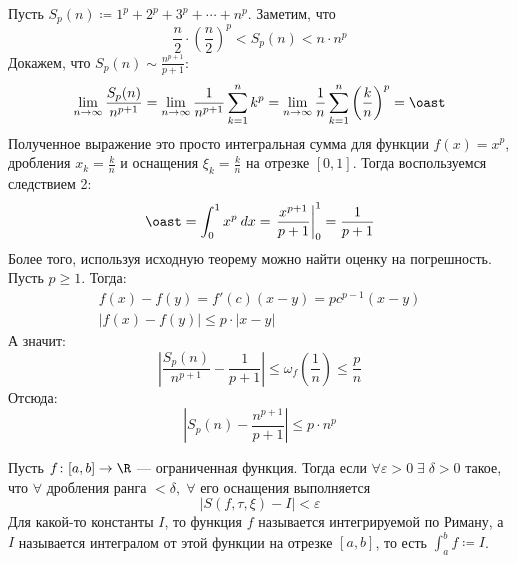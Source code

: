 \begin{example}
  Пусть $S_p(n) \coloneqq 1^p + 2^p + 3^p + \dotsb + n^p$. Заметим, что
  \begin{equation*}
    \frac{n}{2} \cdot \left(\frac{n}{2} \right)^p < S_p(n) < n \cdot n^p
  \end{equation*}
  Докажем, что $S_p(n) \sim \frac{n^{p + 1}}{p + 1}$:
  \begin{equation*}
      \lim\limits_{n \to \infty} \frac{S_p(n)}{n^{p + 1}} =
      \lim\limits_{n \to \infty} \frac{1}{n^{p + 1}}\sum_{k = 1}^{n} k^p =
      \lim\limits_{n \to \infty} \frac{1}{n}\sum_{k = 1}^{n} \left(\frac{k}{n}\right)^p = \oast
  \end{equation*}
  Полученное выражение это просто интегральная сумма для функции $f(x) = x^p$, дробления $x_k = \frac{k}{n}$ и оснащения $\xi_k = \frac{k}{n}$ на отрезке $[0, 1]$. Тогда воспользуемся следствием 2:
  \begin{equation*}
      \oast = \int_{0}^{1} x^p \: dx = \left. \frac{x^{p + 1}}{p + 1} \right|_{0}^{1} = \frac{1}{p + 1}
  \end{equation*}
  Более того, используя исходную теорему можно найти оценку на погрешность. Пусть $p \geq 1$. Тогда:
  \begin{equation*}
    \begin{gathered}
      f(x) - f(y) = f'(c)(x - y) = pc^{p - 1}(x - y) \\
      | f(x) - f(y) | \leq p \cdot |x - y|
    \end{gathered}
  \end{equation*}
  А значит:
  \begin{equation*}
    \left |
      \frac{S_p(n)}{n^{p + 1}} - \frac{1}{p + 1}
    \right |
    \leq \omega_f\left(\frac{1}{n}\right) \leq \frac{p}{n}
  \end{equation*}
  Отсюда:
  \begin{equation*}
    \left |
      S_p(n) -
      \frac{n^{p + 1}}{p + 1}
    \right |
    \leq p \cdot n^p
  \end{equation*}
\end{example}

\begin{conj}
    Пусть $f\colon [a, b] \to \R$ --- ограниченная функция.
    Тогда если $\forall \varepsilon > 0 \; \exists \; \delta > 0$ такое, что $\forall$ дробления ранга $< \delta,\; \forall$ его оснащения выполняется
    \begin{equation*}
        | S(f, \tau, \xi) - I| < \varepsilon
    \end{equation*}
    Для какой-то константы $I$, то функция $f$ называется интегрируемой по Риману, а $I$ называется интегралом от этой функции на отрезке $[a, b]$, то есть $\int_{a}^{b} f \coloneqq I$.
\end{conj}

